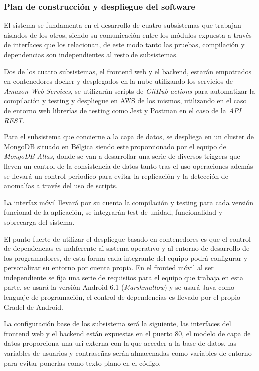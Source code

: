 \documentclass{article}
\begin{document}
\subsubsection{Plan de construcción y despliegue del software}

El sistema se fundamenta en el desarrollo de cuatro subsistemas que trabajan aislados de los otros, siendo su comunicación entre los módulos expuesta a través de interfaces que los relacionan, de este modo tanto las pruebas, compilación y dependencias son independientes al resto de subsistemas. 

Dos de los cuatro subsistemas, el frontend web y el backend, estarán empotrados en contenedores docker y desplegados en la nube utilizando los servicios de \textit{Amazon Web Services}, se utilizarán scripts de \textit{GitHub actions} para automatizar la compilación y testing y despliegue en AWS de los mismos, utilizando en el caso de entorno web librerías de testing como Jest y Postman en el caso de la \textit{API REST}. 

Para el subsistema que concierne a la capa de datos, se despliega en un cluster de MongoDB situado en Bélgica siendo este proporcionado por el equipo de \textit{MongoDB Atlas}, donde se van a desarrollar una serie de diversos triggers que lleven un control de la consistencia de datos tanto tras el uso operaciones además se llevará un control periodico para evitar la replicación y la detección de anomalías a través del uso de scripts.

La interfaz móvil llevará por su cuenta la compilación y testing para cada versión funcional de la aplicación, se integrarán test de unidad, funcionalidad y sobrecarga del sistema.

El punto fuerte de utilizar el despliegue basado en contenedores es que el control de dependencias es indiferente al sistema operativo y al entorno de desarrollo de los programadores, de esta forma cada integrante del equipo podrá configurar y personalizar su entorno por cuenta propia. En el fronted móvil al ser independiente se fija una serie de requisitos para el equipo que trabaja en esta parte, se usará la versión Android 6.1 (\textit{Marshmallow}) y se usará Java como lenguaje de programación, el control de dependencias es llevado por el propio Gradel de Android.

La configuración base de los subsistema será la siguiente, las interfaces del frontend web y el backend están expuestas en el puerto 80, el modelo de capa de datos proporciona una uri externa con la que acceder a la base de datos. las variables de usuarios y contraseñas serán almacenadas como variables de entorno para evitar ponerlas como texto plano en el código.
\end{document}
